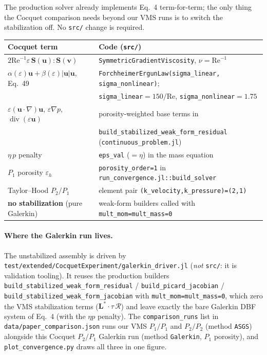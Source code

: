 \documentclass[11pt]{article}
\newcommand{\uu}{\bm{u}}
\newcommand{\vv}{\bm{v}}
\newcommand{\grad}{\nabla}
\newcommand{\dive}{\operatorname{div}}
\newcommand{\Reyn}{\mathrm{Re}}
\newcommand{\Sten}{\bm{S}}
\begin{document}
The production solver already implements Eq.~4 term-for-term; the only thing the Cocquet comparison
needs beyond our VMS runs is to switch the stabilization off. No \texttt{src/} change is required.

\begin{center}
\begin{tabular}{@{}ll@{}}
\hline
Cocquet term & Code (\texttt{src/}) \\
\hline
$2\Reyn^{-1}\varepsilon\,\Sten(\uu){:}\Sten(\vv)$ & \texttt{SymmetricGradientViscosity}, $\nu=\Reyn^{-1}$ \\
$\alpha(\varepsilon)\uu+\beta(\varepsilon)|\uu|\uu$, Eq.~49 & \texttt{ForchheimerErgunLaw(sigma\_linear,\,sigma\_nonlinear)}; \\
 & \texttt{sigma\_linear}$=150/\Reyn$, \texttt{sigma\_nonlinear}$=1.75$ \\
$\varepsilon(\uu\cdot\grad)\uu$, $\varepsilon\grad p$, $\dive(\varepsilon\uu)$ & porosity-weighted base terms in \\
 & \texttt{build\_stabilized\_weak\_form\_residual} (\texttt{continuous\_problem.jl}) \\
$\eta\,p$ penalty & \texttt{eps\_val} ($=\eta$) in the mass equation \\
$P_1$ porosity $\varepsilon_h$ & \texttt{porosity\_order=1} in \texttt{run\_convergence.jl::build\_solver} \\
Taylor--Hood $P_2/P_1$ & element pair \texttt{(k\_velocity,k\_pressure)=(2,1)} \\
\textbf{no stabilization} (pure Galerkin) & weak-form builders called with
   \texttt{mult\_mom=mult\_mass=0} \\
\hline
\end{tabular}
\end{center}

\paragraph{Where the Galerkin run lives.} The unstabilized assembly is driven by
\texttt{test/extended/CocquetExperiment/galerkin\_driver.jl} (\emph{not} \texttt{src/}: it is validation
tooling). It reuses the production builders
\texttt{build\_stabilized\_weak\_form\_residual} / \texttt{build\_picard\_jacobian} /
\texttt{build\_stabilized\_weak\_form\_jacobian} with \texttt{mult\_mom=mult\_mass=0}, which zero the VMS
stabilization terms ($\bm L^\ast\!\cdot\tau\,\mathcal R$) and leave exactly the bare Galerkin DBF system
of Eq.~4 (with the $\eta p$ penalty). The \texttt{comparison\_runs} list in
\texttt{data/paper\_comparison.json} runs our VMS $P_1/P_1$ and $P_2/P_2$ (method \texttt{ASGS}) alongside
this Cocquet $P_2/P_1$ Galerkin run (method \texttt{Galerkin}, $P_1$ porosity), and
\texttt{plot\_convergence.py} draws all three in one figure.
\end{document}
